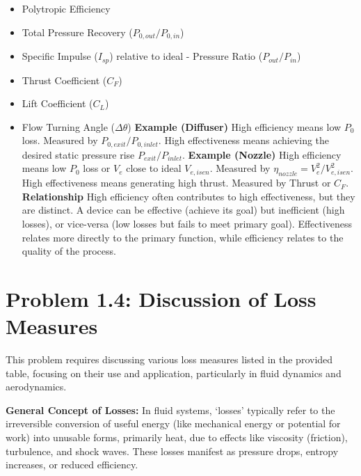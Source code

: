 \begin{itemize}
\tightlist
\item
  Polytropic Efficiency
\item
  Total Pressure Recovery (\(P_{0,out}/P_{0,in}\))
\item
  Specific Impulse (\(I_{sp}\)) relative to ideal \textbar{} - Pressure
  Ratio (\(P_{out}/P_{in}\))
\item
  Thrust Coefficient (\(C_F\))
\item
  Lift Coefficient (\(C_L\))
\item
  Flow Turning Angle (\(\Delta\theta\)) \textbar{} \textbar{}
  \textbf{Example (Diffuser)} \textbar{} High efficiency means low
  \(P_0\) loss. Measured by \(P_{0,exit}/P_{0,inlet}\). \textbar{} High
  effectiveness means achieving the desired static pressure rise
  \(P_{exit}/P_{inlet}\). \textbar{} \textbar{} \textbf{Example
  (Nozzle)} \textbar{} High efficiency means low \(P_0\) loss or \(V_e\)
  close to ideal \(V_{e,isen}\). Measured by
  \(\eta_{nozzle} = V_e^2 / V_{e,isen}^2\). \textbar{} High
  effectiveness means generating high thrust. Measured by Thrust or
  \(C_F\). \textbar{} \textbar{} \textbf{Relationship}\textbar{} High
  efficiency often contributes to high effectiveness, but they are
  distinct. A device can be effective (achieve its goal) but inefficient
  (high losses), or vice-versa (low losses but fails to meet primary
  goal). \textbar{} Effectiveness relates more directly to the primary
  function, while efficiency relates to the quality of the process.
  \textbar{}
\end{itemize}

\hypertarget{problem-1.4-discussion-of-loss-measures}{%
\section{Problem 1.4: Discussion of Loss
Measures}\label{problem-1.4-discussion-of-loss-measures}}

This problem requires discussing various loss measures listed in the
provided table, focusing on their use and application, particularly in
fluid dynamics and aerodynamics.

\textbf{General Concept of Losses:} In fluid systems, `losses' typically
refer to the irreversible conversion of useful energy (like mechanical
energy or potential for work) into unusable forms, primarily heat, due
to effects like viscosity (friction), turbulence, and shock waves. These
losses manifest as pressure drops, entropy increases, or reduced
efficiency.

